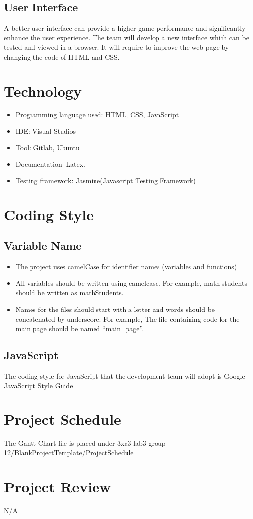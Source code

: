 \documentclass{article}
\begin{document}
\subsection{User Interface}
A better user interface can provide a higher game performance and significantly enhance the user experience. The team will develop a new interface which can be tested and viewed in a browser. It will require to improve the web page by changing the code of HTML and CSS.





\section{Technology}
\begin{itemize}
  \item Programming language used: HTML, CSS, JavaScript
  \item IDE: Visual Studios
  \item Tool: Gitlab, Ubuntu
  \item Documentation: Latex.
  \item Testing framework: Jasmine(Javascript Testing Framework)
\end{itemize}

\section{Coding Style}
\subsection{Variable Name}
\begin{itemize}
  \item The project uses camelCase for identifier names (variables and functions)
  \item All variables should be written using camelcase. For example, math students should be written as mathStudents.
  \item Names for the files should start with a letter and words should be concatenated by underscore. For example, The file containing code for the main page should be named \enquote{main\_page}.
\end{itemize}
\subsection{JavaScript}
The coding style for JavaScript that the development team will adopt is Google JavaScript Style Guide



\section{Project Schedule}

The Gantt Chart file is placed under 3xa3-lab3-group-12/BlankProjectTemplate/ProjectSchedule

\section{Project Review}
N/A
\end{document}
